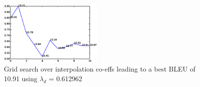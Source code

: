      \begin{figure}
                \small
                \centering
                \includegraphics[width=0.45\textwidth]{files/Figures/condor_run.eps}
                \caption{Grid search over interpolation co-effs leading to a best BLEU of 10.91 using $\lambda_{d}$ = 0.612962}
                \label{fig:condor}
     \end{figure}

